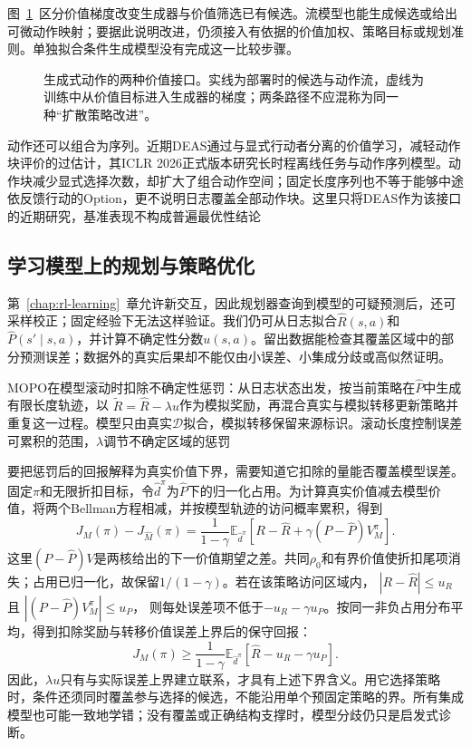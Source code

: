 图~\ref{fig:rl-information-extraction}~区分价值梯度改变生成器与价值筛选已有候选。流模型也能生成候选或给出可微动作映射；要据此说明改进，仍须接入有依据的价值加权、策略目标或规划准则。单独拟合条件生成模型没有完成这一比较步骤。

\begin{figure}[htbp]
  \centering
  
  \caption{生成式动作的两种价值接口。实线为部署时的候选与动作流，虚线为训练中从价值目标进入生成器的梯度；两条路径不应混称为同一种“扩散策略改进”。}
  \label{fig:rl-information-extraction}
\end{figure}

动作还可以组合为序列。近期DEAS通过与显式行动者分离的价值学习，减轻动作块评价的过估计，其ICLR 2026正式版本研究长时程离线任务与动作序列模型。动作块减少显式选择次数，却扩大了组合动作空间；固定长度序列也不等于能够中途依反馈行动的Option，更不说明日志覆盖全部动作块。这里只将DEAS作为该接口的近期研究，基准表现不构成普遍最优性结论

\subsection{学习模型上的规划与策略优化}
\label{sec:rl-information-model-learning}

第~\ref{chap:rl-learning}~章允许新交互，因此规划器查询到模型的可疑预测后，还可采样校正；固定经验下无法这样验证。我们仍可从日志拟合$\widehat R(s,a)$和$\widehat P(s'\mid s,a)$，并计算不确定性分数$u(s,a)$。留出数据能检查其覆盖区域中的部分预测误差；数据外的真实后果却不能仅由小误差、小集成分歧或高似然证明。

MOPO在模型滚动时扣除不确定性惩罚：从日志状态出发，按当前策略在$\widehat P$中生成有限长度轨迹，以
$\widetilde R=\widehat R-\lambda u$作为模拟奖励，再混合真实与模拟转移更新策略并重复这一过程。模型只由真实$\mathcal D$拟合，模拟转移保留来源标识。滚动长度控制误差可累积的范围，$\lambda$调节不确定区域的惩罚

要把惩罚后的回报解释为真实价值下界，需要知道它扣除的量能否覆盖模型误差。固定$\pi$和无限折扣目标，令$\widehat d^\pi$为$\widehat P$下的归一化占用。为计算真实价值减去模型价值，将两个Bellman方程相减，并按模型轨迹的访问概率累积，得到
\begin{equation}
  \label{eq:rl-information-model-telescoping}
  J_M(\pi)-J_{\widehat M}(\pi)
  =\frac1{1-\gamma}\mathbb E_{\widehat d^\pi}
       \left[R-\widehat R
                  +\gamma(P-\widehat P)V_M^\pi\right].
\end{equation}
这里$(P-\widehat P)V$是两核给出的下一价值期望之差。共同$\rho_0$和有界价值使折扣尾项消失；占用已归一化，故保留$1/(1-\gamma)$。若在该策略访问区域内，
$|R-\widehat R|\leq u_R$且
$|(P-\widehat P)V_M^\pi|\leq u_P$，
则每处误差项不低于$-u_R-\gamma u_P$。按同一非负占用分布平均，得到扣除奖励与转移价值误差上界后的保守回报：
\[
  J_M(\pi)\geq
    \frac1{1-\gamma}\mathbb E_{\widehat d^\pi}
       [\widehat R-u_R-\gamma u_P].
\]
因此，$\lambda u$只有与实际误差上界建立联系，才具有上述下界含义。用它选择策略时，条件还须同时覆盖参与选择的候选，不能沿用单个预固定策略的界。所有集成模型也可能一致地学错；没有覆盖或正确结构支撑时，模型分歧仍只是启发式诊断。

